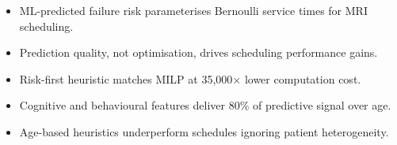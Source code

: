 \documentclass[11pt,a4paper]{letter}
\date{\today}
\begin{document}
\begin{itemize}
    \item ML-predicted failure risk parameterises Bernoulli service times for MRI scheduling.
    \item Prediction quality, not optimisation, drives scheduling performance gains.
    \item Risk-first heuristic matches MILP at 35{,}000$\times$ lower computation cost.
    \item Cognitive and behavioural features deliver 80\% of predictive signal over age.
    \item Age-based heuristics underperform schedules ignoring patient heterogeneity.
\end{itemize}
\end{document}
